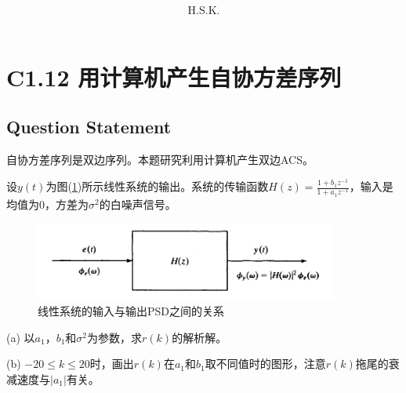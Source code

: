 \documentclass[UTF-8, a4paper, 12pt]{ctexart}
\title{\bfseries \Huge  }
\author{H.S.K.}
\date{}
\begin{document}


 


     

     
\tableofcontents\thispagestyle{empty}
\newpage
\setcounter{page}{1}        %



\section{C1.12 用计算机产生自协方差序列}

\subsection{Question Statement}
自协方差序列是双边序列。本题研究利用计算机产生双边ACS。


设$y(t)$为图(\ref{filter})所示线性系统的输出。系统的传输函数$H(z)=\frac{1+b_1z^{-1}}{1+a_1z^{-1}}$，输入是均值为0，方差为$\sigma^2$的白噪声信号。
\begin{figure}[htbp]
    \centering
    \includegraphics[width=10cm]{fig/f1.png}
    \caption{线性系统的输入与输出PSD之间的关系}
    \label{filter}
\end{figure}

(a) 以$a_1$，$b_1$和$\sigma^2$为参数，求$r(k)$的解析解。

(b) $-20\leq k\leq 20$时，画出$r(k)$在$a_1$和$b_1$取不同值时的图形，注意$r(k)$拖尾的衰减速度与$|a_1|$有关。
\end{document}
